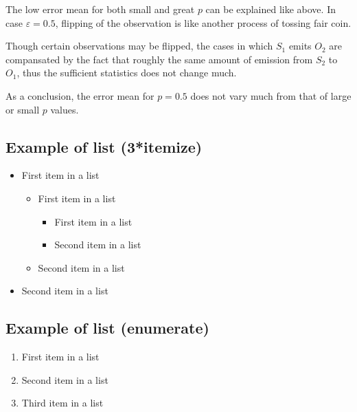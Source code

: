 \documentclass[paper=a4, fontsize=11pt]{scrartcl} %
\numberwithin{equation}{section} %
\numberwithin{figure}{section} %
\numberwithin{table}{section} %
\begin{document}
The low error mean for both small and great $p$ can be explained like above. In case $\varepsilon=0.5$, flipping of the observation is like another process of tossing fair coin.

Though certain observations may be flipped, the cases in which $S_1$ emits $O_2$ are compansated by the fact that roughly the same amount of emission from $S_2$ to $O_1$, thus the sufficient statistics does not change much.

As a conclusion, the error mean for $p=0.5$ does not vary much from that of large or small $p$ values.


\subsection{Example of list (3*itemize)}
\begin{itemize}
	\item First item in a list 
		\begin{itemize}
		\item First item in a list 
			\begin{itemize}
			\item First item in a list 
			\item Second item in a list 
			\end{itemize}
		\item Second item in a list 
		\end{itemize}
	\item Second item in a list 
\end{itemize}


\subsection{Example of list (enumerate)}
\begin{enumerate}
\item First item in a list 
\item Second item in a list 
\item Third item in a list
\end{enumerate}

\end{document}
